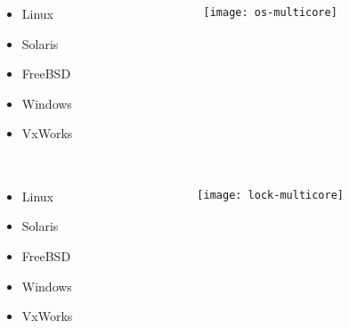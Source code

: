 \begin{frame}
	\frametitle{ }
	\begin{columns}
		\begin{column}{.3\textwidth}
			
			\begin{itemize}\LARGE
				\item Linux
				\item Solaris
				\item FreeBSD
				\item Windows
				\item VxWorks
				
			\end{itemize}
			
		\end{column}
		
		\begin{column}{0.7\textwidth}
			
			\texttt{[image: os-multicore]}
			
		\end{column}
	\end{columns}
\end{frame}

\begin{frame}
	\frametitle{ }
	\begin{columns}[t]
		\begin{column}{.3\textwidth}
			\begin{itemize}\LARGE
				\item Linux
				\item Solaris
				\item FreeBSD
				\item Windows
				\item VxWorks
				
			\end{itemize}
			
		\end{column}
		
		\begin{column}{0.7\textwidth}
			
			\texttt{[image: lock-multicore]}
			
		\end{column}
	\end{columns}
\end{frame}

